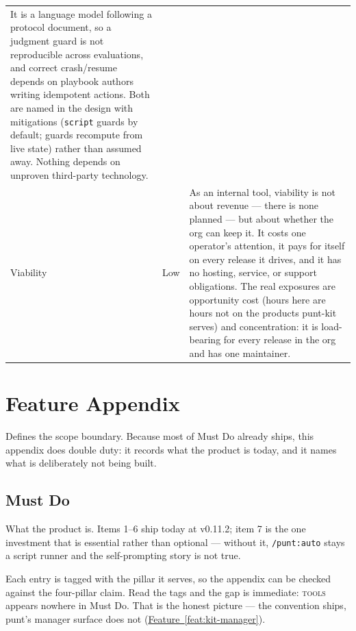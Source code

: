 \documentclass[11pt,letterpaper]{article}
\newcommand{\featureref}[1]{\hyperref[#1]{Feature~\ref*{#1}}}
\begin{document}
\begin{tabularx}{\textwidth}{@{} l l X @{}}
  It is a language model following a protocol document, so a judgment guard is
  not reproducible across evaluations, and correct crash/resume depends on
  playbook authors writing idempotent actions. Both are named in the design
  with mitigations (\texttt{script} guards by default; guards recompute from
  live state) rather than assumed away. Nothing depends on unproven
  third-party technology. \\
Viability & \textcolor{RiskGreen}{Low} &
  As an internal tool, viability is not about revenue --- there is none
  planned --- but about whether the org can keep it. It costs one operator's
  attention, it pays for itself on every release it drives, and it has no
  hosting, service, or support obligations. The real exposures are opportunity
  cost (hours here are hours not on the products punt-kit serves) and
  concentration: it is load-bearing for every release in the org and has one
  maintainer. \\
\bottomrule
\end{tabularx}
\renewcommand{\arraystretch}{1.0}


\newpage
\section*{Feature Appendix}

Defines the scope boundary. Because most of Must Do already ships, this
appendix does double duty: it records what the product is today, and it names
what is deliberately not being built.

\subsection*{Must Do}

What the product is. Items 1--6 ship today at v0.11.2; item 7 is the one
investment that is essential rather than optional --- without it,
\texttt{/punt:auto} stays a script runner and the self-prompting story is not
true.

Each entry is tagged with the pillar it serves, so the appendix can be checked
against the four-pillar claim. Read the tags and the gap is immediate:
\textsc{tools} appears nowhere in Must Do. That is the honest picture --- the
convention ships, punt's manager surface does not
(\featureref{feat:kit-manager}).
\end{document}
